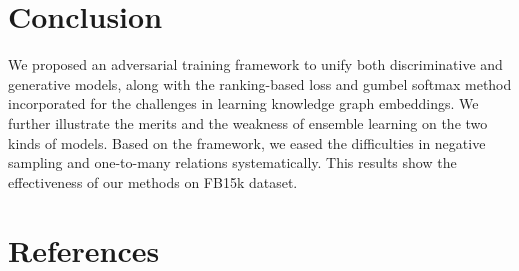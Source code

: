 \documentclass[twocolumn,a4paper,preprint,10pt,3p]{elsarticle}
\begin{document}
\section{Conclusion}

We proposed an adversarial training framework to unify both discriminative and generative models, along with the ranking-based loss and gumbel softmax method incorporated for the challenges in learning knowledge graph embeddings. We further illustrate the merits and the weakness of ensemble learning on the two kinds of models. Based on the framework, we eased the difficulties in negative sampling and one-to-many relations systematically. This results show the effectiveness of our methods on FB15k dataset.

\section*{References}



\end{document}
